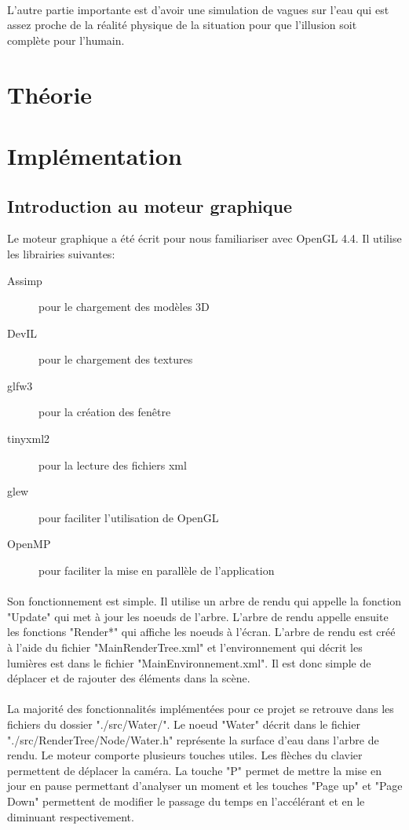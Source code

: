 \documentclass[a4paper, 12pt]{article} %
\begin{document}
    \paragraph{}
    L'autre partie importante est d'avoir une simulation de vagues sur l'eau qui est assez
    proche de la réalité physique de la situation pour que l'illusion soit complète pour 
    l'humain. 

\section{Théorie}
\section{Implémentation}
\subsection{Introduction au moteur graphique}
	Le moteur graphique a été écrit pour nous familiariser avec OpenGL 4.4. Il utilise les librairies suivantes:
	\begin{description}
		\item[Assimp] pour le chargement des modèles 3D
		\item[DevIL] pour le chargement des textures
		\item[glfw3] pour la création des fenêtre
		\item[tinyxml2] pour la lecture des fichiers xml
		\item[glew] pour faciliter l'utilisation de OpenGL
		\item[OpenMP] pour faciliter la mise en parallèle de l'application
	\end{description}
	
	\paragraph{}
	Son fonctionnement est simple. Il utilise un arbre de rendu qui appelle la fonction "Update" qui met à jour les noeuds de l'arbre.
	L'arbre de rendu appelle ensuite les fonctions "Render*" qui affiche les noeuds à l'écran. L'arbre de rendu est créé à l'aide du
	fichier "MainRenderTree.xml" et l'environnement qui décrit les lumières est dans le fichier "MainEnvironnement.xml". Il est donc
	simple de déplacer et de rajouter des éléments dans la scène.

	\paragraph{}
	La majorité des fonctionnalités implémentées pour ce projet se retrouve dans les fichiers du dossier "./src/Water/". Le noeud 
	"Water" décrit dans le fichier "./src/RenderTree/Node/Water.h" représente la surface d'eau dans l'arbre de rendu.
	Le moteur comporte plusieurs touches utiles. Les flèches du clavier permettent de déplacer la caméra. La touche "P" permet de mettre la mise en jour
	en pause permettant d'analyser un moment et les touches "Page up" et "Page Down" permettent de modifier le passage du temps en l'accélérant et en 
	le diminuant respectivement.
\end{document}

